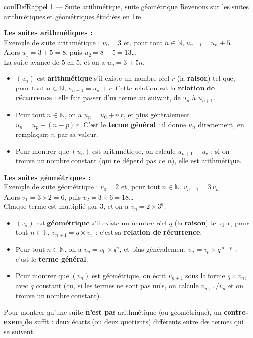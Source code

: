 \documentclass[11pt,a4paper]{article}
\makeatletter
\newcommand{\N}{\mathbb{N}}
\newcounter{lycee@signet}
\newcommand{\signet}[3][]{\stepcounter{lycee@signet}%
  \edef\lycee@dest{\if\relax\detokenize{#1}\relax
    signet.\arabic{lycee@signet}\else#1\fi}%
  \hypertarget{\lycee@dest}{}\bookmark[level=#2,dest=\lycee@dest]{#3}}
\def\textsuperscript#1{#1}\def\dfrac#1#2{#1/#2}\def\frac#1#2{#1/#2}%
\newenvironment{definitionbox}[1][Définition]%
  {\begin{boitecours}[phantom={\signet{2}{#1}}]{coulDef}{#1}}{\end{boitecours}}
\makeatother
\begin{document}
\begin{definitionbox}[Rappel 1 --- Suite arithmétique, suite géométrique]
Revenons sur les suites arithmétiques et géométriques étudiées en 1\textsuperscript{re}.

\smallskip
\textbf{Les suites arithmétiques :}\\
Exemple de suite arithmétique : $u_{0}=3$ et, pour tout $n\in\N$, $u_{n+1}=u_{n}+5$.\\
Alors $u_{1}=3+5=8$, puis $u_{2}=8+5=13$…\\
La suite \og avance de $5$ en $5$\fg{}, et on a $u_{n}=3+5n$.
\begin{itemize}
  \item $(u_{n})$ est \textbf{arithmétique} s'il existe un nombre réel $r$ (la
        \textbf{raison}) tel que, pour tout $n\in\N$, $u_{n+1}=u_{n}+r$. Cette relation
        est la \textbf{relation de récurrence} : elle fait passer d'un terme au suivant,
        de $u_{n}$ à $u_{n+1}$.
  \item Pour tout $n\in\N$, on a $u_{n}=u_{0}+n\,r$, et plus généralement
        $u_{n}=u_{p}+(n-p)\,r$. C'est le \textbf{terme général} : il donne $u_{n}$
        directement, en remplaçant $n$ par sa valeur.
  \item Pour montrer que $(u_{n})$ est arithmétique, on calcule $u_{n+1}-u_{n}$ : si on
        trouve un nombre constant (qui ne dépend pas de $n$), elle est arithmétique.
\end{itemize}

\medskip
\textbf{Les suites géométriques :}\\
Exemple de suite géométrique : $v_{0}=2$ et, pour tout $n\in\N$, $v_{n+1}=3\,v_{n}$.\\
Alors $v_{1}=3\times 2=6$, puis $v_{2}=3\times 6=18$…\\
Chaque terme est \og multiplié par $3$\fg{}, et on a $v_{n}=2\times 3^{n}$.
\begin{itemize}
  \item $(v_{n})$ est \textbf{géométrique} s'il existe un nombre réel $q$ (la
        \textbf{raison}) tel que, pour tout $n\in\N$, $v_{n+1}=q\times v_{n}$ : c'est sa
        \textbf{relation de récurrence}.
  \item Pour tout $n\in\N$, on a $v_{n}=v_{0}\times q^{n}$, et plus généralement
        $v_{n}=v_{p}\times q^{\,n-p}$ : c'est le \textbf{terme général}.
  \item Pour montrer que $(v_{n})$ est géométrique, on écrit $v_{n+1}$ sous la forme
        $q\times v_{n}$, avec $q$ constant (ou, si les termes ne sont pas nuls, on calcule
        $\frac{v_{n+1}}{v_{n}}$ et on trouve un nombre constant).
\end{itemize}

\medskip
Pour montrer qu'une suite \textbf{n'est pas} arithmétique (ou géométrique), un
\textbf{contre-exemple} suffit : deux écarts (ou deux quotients) différents entre des
termes qui se suivent.
\end{definitionbox}
\end{document}
